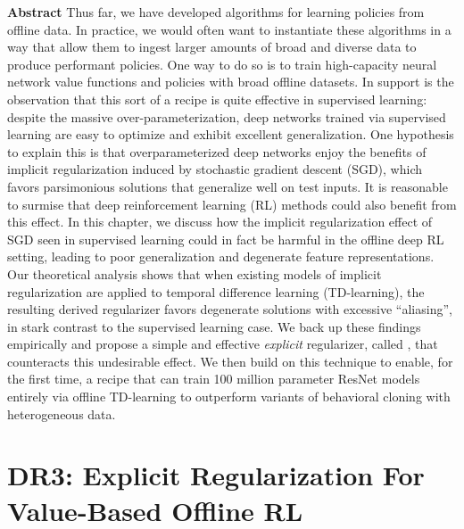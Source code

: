 \documentclass[../thesis.tex]{subfiles}
\begin{document}

\vspace{-0.4cm}
\begin{AIbox}{\large{\textbf{Abstract}}}
\vspace{4mm}
Thus far, we have developed algorithms for learning policies from offline data. In practice, we would often want to instantiate these algorithms in a way that allow them to ingest larger amounts of broad and diverse data to produce performant policies. One way to do so is to train high-capacity neural network value functions and policies with broad offline datasets. In support is the observation that this sort of a recipe is quite effective in supervised learning: despite the massive over-parameterization, deep networks trained via supervised learning are easy to optimize and exhibit excellent generalization. One hypothesis to explain this is that overparameterized deep networks enjoy the benefits of implicit regularization induced by stochastic gradient descent (SGD), which favors parsimonious solutions that generalize well on test inputs. It is reasonable to surmise that deep reinforcement learning (RL) methods could also benefit from this effect. In this chapter, we discuss how the implicit regularization effect of SGD seen in supervised learning could in fact be harmful in the offline deep RL setting, leading to poor generalization and degenerate feature representations. Our theoretical analysis shows that when existing models of implicit regularization are applied to temporal difference learning (TD-learning), the resulting derived regularizer favors degenerate solutions with excessive ``aliasing'', in stark contrast to the supervised learning case. We back up these findings empirically and propose a simple and effective \emph{explicit} regularizer, called \drmethodname, that counteracts this undesirable effect. We then build on this technique to enable, for the first time, a recipe that can train 100 million parameter ResNet models entirely via offline TD-learning to outperform variants of behavioral cloning with heterogeneous data.
\vspace{2mm}
\end{AIbox}




\section{DR3: Explicit Regularization For Value-Based Offline RL}
\end{document}
